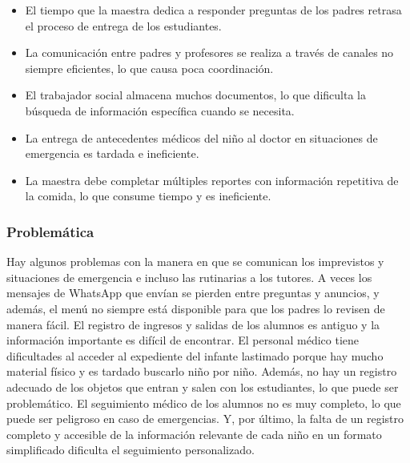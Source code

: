 \documentclass{article}
\begin{document}
\begin{itemize}
	\item El tiempo que la maestra dedica a responder preguntas de los padres retrasa el proceso de entrega de los estudiantes.
	\item La comunicación entre padres y profesores se realiza a través de canales no siempre eficientes, lo que causa poca coordinación.
	\item El trabajador social almacena muchos documentos, lo que dificulta la búsqueda de información específica cuando se necesita.
	\item La entrega de antecedentes médicos del niño al doctor en situaciones de emergencia es tardada e ineficiente.
	\item La maestra debe completar múltiples reportes con información repetitiva de la comida, lo que consume tiempo y es ineficiente.
\end{itemize}

\subsubsection{Problemática}

Hay algunos problemas con la manera en que se comunican los imprevistos y situaciones de emergencia e incluso las rutinarias a los tutores. A veces los mensajes de WhatsApp que envían se pierden entre preguntas y anuncios, y además, el menú no siempre está disponible para que los padres lo revisen de manera fácil. El registro de ingresos y salidas de los alumnos es antiguo y la información importante es difícil de encontrar.
El personal médico tiene dificultades al acceder al expediente del infante lastimado porque hay mucho material físico y es tardado buscarlo niño por niño.
Además, no hay un registro adecuado de los objetos que entran y salen con los estudiantes, lo que puede ser problemático. El seguimiento médico de los alumnos no es muy completo, lo que puede ser peligroso en caso de emergencias. Y, por último, la falta de un registro completo y accesible de la información relevante de cada niño en un formato simplificado dificulta el seguimiento personalizado.
\end{document}
